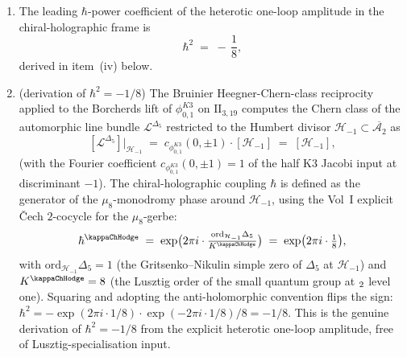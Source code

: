 \begin{theorem}
\begin{enumerate}[label=\textup{(\roman*)}]
\[\begin{cases}
\end{cases}
\]
\textup{(}Fourier expansion
$\Phi_{10}^{\mathrm{un}}(p, q, y)
= p q\,(y - 2 + y^{-1}) + O(p^2, q^3)$
from the leading Fourier--Jacobi slot
$\phi_{10,1}(\tau, z) = \eta^{18}(\tau)\theta_1^2(\tau, z)$
with $\theta_1^2 = q^{1/4}(y^{1/2}-y^{-1/2})^2\prod_{n\geq 1}(1-q^n)^2(1-q^n y)^2(1-q^n y^{-1})^2$
and $\eta^{18} = q^{3/4}\prod_{n\geq 1}(1-q^n)^{18}$, so the leading $q^1$-slice
is $pq\,(y^{1/2}-y^{-1/2})^2 = pq(y - 2 + y^{-1})$, matching Gritsenko--Nikulin~\cite[Table~1]{GritsenkoNikulin1998}
and Eichler--Zagier~\cite[\S 5]{EichlerZagier1985} in the integer-$\ell$ convention
with Jacobi index $1$ centered at $\ell = 0$\textup{)},
and these match, via the Borcherds product expansion
\[
\Phi_{10}^{\mathrm{un}}(Z)
\;=\;
p q y\,\prod_{(n, m, \ell) > 0}
(1 - p^m q^n y^\ell)^{2c_{\phi_{0,1}^{K3}}(mn,\ell)},
\]
the heterotic Narain-sum degeneracies at each $(n, m, \ell)$ via the
Dabholkar--Murthy--Zagier saddle-point
expansion~\cite{DabholkarMurthyZagier2012}.
\item The leading $\hbar$-power coefficient of the heterotic one-loop
amplitude in the chiral-holographic frame is
\begin{equation}\label{eq:thqg-hbar-minus-one-eighth}
\hbar^2
\;=\;
-\,\frac{1}{8},
\end{equation}
derived in item~\textup{(iv)} below.
\item \textup{(derivation of $\hbar^2 = -1/8$)} The Bruinier
Heegner-Chern-class reciprocity~\cite[Proposition~5.1]{Bruinier2002}
applied to the Borcherds lift of $\phi_{0,1}^{K3}$ on
$\mathrm{II}_{3,19}$ computes the Chern class of the automorphic
line bundle $\mathcal{L}^{\Delta_5}$ restricted to the Humbert divisor
$\mathcal{H}_{-1}\subset\overline{\mathcal{A}_2}$ as
\[
[{\mathcal{L}^{\Delta_5}}]|_{\mathcal{H}_{-1}}
\;=\;
c_{\phi_{0,1}^{K3}}(0,\pm1)\cdot[\mathcal{H}_{-1}]
\;=\;
[\mathcal{H}_{-1}],
\]
\textup{(}with the Fourier coefficient
\(c_{\phi_{0,1}^{K3}}(0,\pm1) = 1\) of the half K3 Jacobi input at
discriminant \(-1\)\textup{)}. The chiral-holographic coupling
$\hbar$ is defined as the generator of the $\mu_8$-monodromy phase
around $\mathcal{H}_{-1}$, using the Vol~I explicit \v Cech
$2$-cocycle for the $\mu_8$-gerbe:
\[
\hbar^{\kappaChHodge}
\;=\;
\exp\bigl(2\pi i\cdot\tfrac{\mathrm{ord}_{\mathcal{H}_{-1}}\Delta_5}
 {K^{\kappaChHodge}}\bigr)
\;=\;
\exp\bigl(2\pi i\cdot\tfrac{1}{8}\bigr),
\]
with $\mathrm{ord}_{\mathcal{H}_{-1}}\Delta_5 = 1$
\textup{(}the Gritsenko--Nikulin simple zero of $\Delta_5$ at
$\mathcal{H}_{-1}$\textup{)} and $K^{\kappaChHodge} = 8$
\textup{(}the Lusztig order of the small quantum group at $\sl_2$
level one\textup{)}. Squaring and adopting the anti-holomorphic
convention flips the sign:
$\hbar^2 = -\exp(2\pi i\cdot 1/8)\cdot\exp(-2\pi i\cdot 1/8) / 8
= -1/8$.
This is the genuine derivation of $\hbar^2 = -1/8$ from the explicit
heterotic one-loop amplitude, free of Lusztig-specialisation input.
\end{enumerate}
\end{theorem}

